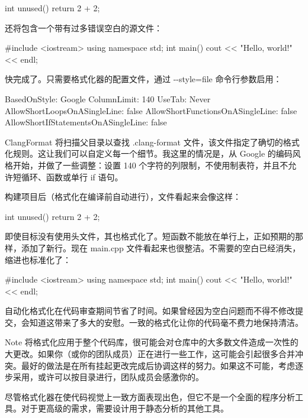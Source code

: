 \begin{cpp}
int unused() { return 2 + 2; }
\end{cpp}

还将包含一个带有过多错误空白的源文件：


\begin{cpp}
#include <iostream>
                                using namespace std;
                    int main() {
        cout << "Hello, world!" << endl;
                                            }
\end{cpp}

快完成了。只需要格式化器的配置文件，通过 -{}-style=file 命令行参数启用：



\begin{shell}
BasedOnStyle: Google
ColumnLimit: 140
UseTab: Never
AllowShortLoopsOnASingleLine: false
AllowShortFunctionsOnASingleLine: false
AllowShortIfStatementsOnASingleLine: false
\end{shell}

ClangFormat 将扫描父目录以查找 .clang-format 文件，该文件指定了确切的格式化规则。这让我们可以自定义每一个细节。我这里的情况是，从 Google 的编码风格开始，并做了一些调整：设置 140 个字符的列限制，不使用制表符，并且不允许短循环、函数或单行 if 语句。

构建项目后（格式化在编译前自动进行），文件看起来会像这样：


\begin{cpp}
int unused() {
    return 2 + 2;
}
\end{cpp}

即使目标没有使用头文件，其也格式化了。短函数不能放在单行上，正如预期的那样，添加了新行。现在 main.cpp 文件看起来也很整洁。不需要的空白已经消失，缩进也标准化了：


\begin{cpp}
#include <iostream>
using namespace std;
int main() {
    cout << "Hello, world!" << endl;
}
\end{cpp}

自动化格式化在代码审查期间节省了时间。如果曾经因为空白问题而不得不修改提交，会知道这带来了多大的安慰。一致的格式化让你的代码毫不费力地保持清洁。

\begin{myNotic}{Note}
将格式化应用于整个代码库，很可能会对仓库中的大多数文件造成一次性的大更改。如果你（或你的团队成员）正在进行一些工作，这可能会引起很多合并冲突。最好的做法是在所有挂起更改完成后协调这样的努力。如果这不可能，考虑逐步采用，或许可以按目录进行，团队成员会感激你的。
\end{myNotic}

尽管格式化器在使代码视觉上一致方面表现出色，但它不是一个全面的程序分析工具。对于更高级的需求，需要设计用于静态分析的其他工具。










